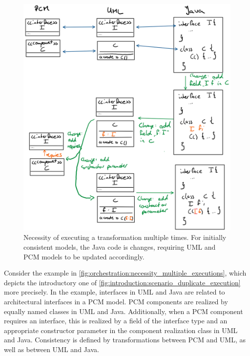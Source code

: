 \begin{figure}
    \centering
    \includegraphics[width=\textwidth]{figures/correctness/orchestration/necessity_multiple_executions.png}
    \caption[Necessity of executing a transformation multiple times]{Necessity of executing a transformation multiple times. For initially consistent models, the Java code is changes, requiring \gls{UML} and \gls{PCM} models to be updated accordingly.}
    \label{fig:orchestration:necessity_multiple_executions}
\end{figure}

Consider the example in \autoref{fig:orchestration:necessity_multiple_executions}, which depicts the introductory one of \autoref{fig:introduction:scenario_duplicate_execution} more precisely.
In the example, interfaces in UML and Java are related to architectural interfaces in a \gls{PCM} model.
\gls{PCM} components are realized by equally named classes in UML and Java.
Additionally, when a \gls{PCM} component requires an interface, this is realized by a field of the interface type and an appropriate constructor parameter in the component realization class in UML and Java.
Consistency is defined by transformations between \gls{PCM} and UML, as well as between UML and Java.

